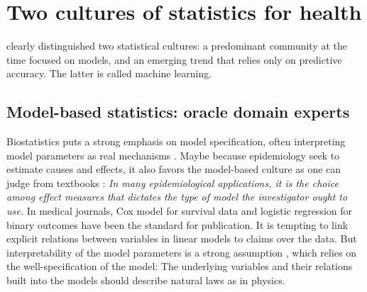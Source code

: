 \documentclass[french,12pt,twoside,a4paper]{book}
\begin{document}
\section{Two cultures of statistics for health}\label{sec:intro:two_cultures}

\cite{breiman2001statistical} clearly distinguished two statistical cultures: a
predominant community at the time focused on models, and an emerging trend that
relies only on predictive accuracy. The latter is called machine learning.

\subsection{Model-based statistics: oracle domain experts}%
\label{subsec:intro:biostatistics_framework}

Biostatistics puts a strong emphasis on model specification, often interpreting
model parameters as real mechanisms \citep{cox2001statistical}. Maybe because
epidemiology seek to estimate causes and effects, it also favors the model-based
culture as one can judge from textbooks \citep{rothman2012epidemiology}:
\textit{In many epidemiological applications, it is the choice among effect
  measures that dictates the type of model the investigator ought to use.} In
medical journals, Cox model for survival data and logistic regression for binary
outcomes have been the standard for publication. %
It is tempting to link explicit relations between variables in linear models to
claims over the data. But interpretability of the model parameters is a strong
assumption \citep{lipton2018mythos}, which relies on the well-specification of
the model: The underlying variables and their relations built into the models
should describe natural laws as in physics.

\end{document}

